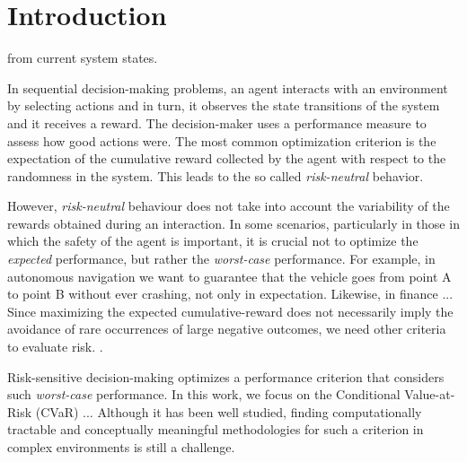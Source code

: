 \chapter{Introduction}
\label{sec:introduction}


from current system states.

In sequential decision-making problems, an agent interacts with an environment by selecting actions and in turn, it observes the state transitions of the system and it receives a reward.
The decision-maker uses a performance measure to assess how good actions were.
The most common optimization criterion is the expectation of the cumulative reward collected by the agent with respect to the randomness in the system. This leads to the so called \textit{risk-neutral} behavior.

However, \textit{risk-neutral} behaviour %
does not take into account the variability of the rewards obtained during an interaction. %
In some scenarios, particularly in those in which the safety of the agent is important, it is crucial not to optimize the {\em expected} performance, but rather the {\em worst-case} performance. 
For example, in autonomous navigation we want to guarantee that the vehicle goes from point A to point B without ever crashing, not only in expectation. 
Likewise, in finance ... 
Since maximizing the expected cumulative-reward does not necessarily imply the avoidance of rare occurrences of large negative outcomes, we need other criteria to evaluate risk. \citep{Garcia2015}.


Risk-sensitive decision-making optimizes a performance criterion that considers such {\em worst-case} performance. 
In this work, we focus on the Conditional Value-at-Risk (CVaR) ... 
Although it has been well studied, finding computationally tractable and conceptually meaningful methodologies for such a criterion in complex environments is still a challenge.

